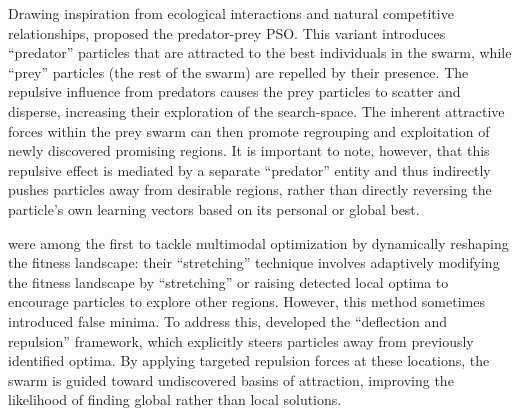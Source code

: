 {Drawing inspiration from ecological interactions and natural competitive relationships, \citet{silva2002empirical} proposed the predator-prey PSO. This variant introduces ``predator'' particles that are attracted to the best individuals in the swarm, while ``prey'' particles (the rest of the swarm) are repelled by their presence. The repulsive influence from predators causes the prey particles to scatter and disperse, increasing their exploration of the \gls{search-space}. The inherent attractive forces within the prey swarm can then promote regrouping and exploitation of newly discovered promising regions.
It is important to note, however, that this repulsive effect is mediated by a separate ``predator'' entity and thus indirectly pushes particles away from desirable regions, rather than directly reversing the particle's own learning vectors based on its personal or global best.


\citet{parsopoulos2001stretching} were among the first to tackle multimodal optimization by dynamically reshaping the fitness landscape: their “stretching” technique involves adaptively modifying the fitness landscape by ``stretching'' or raising detected local optima to encourage particles to explore other regions. However, this method sometimes introduced false minima. To address this, \citet{parsopoulos2004global} developed the ``deflection and repulsion'' framework, which explicitly steers particles away from previously identified optima. By applying targeted repulsion forces at these locations, the swarm is guided toward undiscovered basins of attraction, improving the likelihood of finding global rather than local solutions.


}

